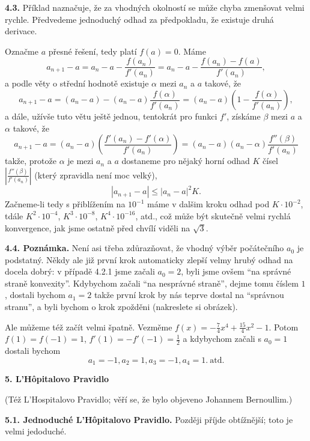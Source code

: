 \documentclass[12pt]{article}
\begin{document}
{{\bigskip

{\bf 4.3.} Příklad naznačuje, že za vhodných okolností se může chyba zmenšovat velmi rychle. Předvedeme jednoduchý odhad za předpokladu, že existuje druhá derivace.

Označme $a$ přesné řešení, tedy platí $f(a)=0$. Máme
$$
a_{n+1}-a=a_n-a-\frac{f(a_n)}{f'(a_n)}= a_n-a-\frac{f(a_n)-f(a)}{f'(a_n)},
$$
 a podle věty o střední hodnotě existuje $\alpha$ mezi $a_n$ a $a$ takové, že
$$
a_{n+1}-a=(a_n-a)-(a_n-a)\frac{f(\alpha)}{f'(a_n)}= (a_n-a)\left(1-\frac{f(\alpha)}{f'(a_n)}\right),
$$
a dále, užívše tuto větu ještě jednou, tentokrát pro funkci $f'$, získáme $\beta$ mezi $a$ a $\alpha$ takové, že
$$
a_{n+1}-a= (a_n-a)\left(\frac{f'(a_n)-f'(\alpha)}{f'(a_n)}\right)=
(a_n-a)(a_n-\alpha)\frac{f''(\beta)}{f'(a_n)}
$$
takže, protože $\alpha$ je mezi $a_n$ a $a$ dostaneme pro nějaký horní odhad $K$ čísel $|\frac{f''(\beta)}{f'(a_n)}|$ (který zpravidla není moc velký),
$$
|a_{n+1}-a|\leq |a_n-a|^2K.
$$
Začneme-li tedy s přiblížením na $10^{-1}$ máme v dalšim kroku odhad pod $K\cdot10^{-2}$, tdále $K^2\cdot10^{-4}$, $K^3\cdot10^{-8}$,
$K^4\cdot10^{-16}$, atd., což může být skutečně velmi rychlá konvergence, jak jsme ostatně před chvílí viděli na $\sqrt 3$.

\bigskip

{\bf 4.4. Poznámka.}  Není asi třeba zdůrazňovat, že vhodný výběr počátečního $a_0$ je podstatný. Někdy  ale již první krok automaticky zlepší velmy hrubý odhad na docela dobrý: v případě 4.2.1 jsme začali $a_0=2$, byli jsme ovšem ``na správné straně konvexity''. Kdybychom začali
``na nesprávné straně'', dejme tomu číslem $1$, dostali bychom $a_1=2$ takže první krok by nás teprve dostal na ``správnou stranu'', a byli bychom o krok zpožděni (nakreslete si obrázek).

Ale můžeme též začít velmi špatně. Vezměme
$
f(x)=-\frac74x^4+\frac{15}{4}x^2 -1$. Potom $f(1)=f(-1)=1$, $f'(1)=-f'(-1)=\frac12$ a kdybychom začali s $a_0=1$ dostali bychom
$$
a_1=-1, a_2=1, a_3=-1, a_4=1. \ \text{atd.}
$$

 \vskip10mm
 
 {\large\bf 5. L'H\^{o}pitalovo Pravidlo}
 
 \bigskip
  
 (T\'e\v z L'Hospitalovo Pravidlo; věří se, že bylo objeveno Johannem Bernoullim.)
 
 \bigskip
 
 {\bf 5.1. Jednoduché L'H\^{o}pitalovo Pravidlo.} Později příjde obtížnější; toto je velmi jedoduché.}
 
}
\end{document}
